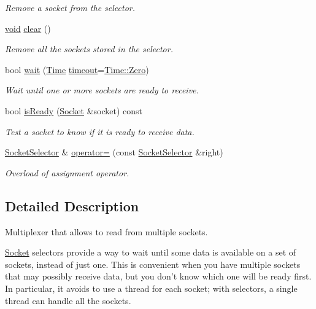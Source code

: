 \begin{DoxyCompactItemize}
\begin{DoxyCompactList}\small\item\em Remove a socket from the selector. \end{DoxyCompactList}\item 
\hyperlink{glutf90_8h_ac778d6f63f1aaf8ebda0ce6ac821b56e}{void} \hyperlink{classsf_1_1_socket_selector_a76e650acb0199d4be91e90a493fbc91a}{clear} ()
\begin{DoxyCompactList}\small\item\em Remove all the sockets stored in the selector. \end{DoxyCompactList}\item 
bool \hyperlink{classsf_1_1_socket_selector_a9cfda5475f17925e65889394d70af702}{wait} (\hyperlink{classsf_1_1_time}{Time} \hyperlink{gl3_8h_ad29bb0d8468b264a4e3d9204366cfaab}{timeout}=\hyperlink{classsf_1_1_time_a8db127b632fa8da21550e7282af11fa0}{Time\-::\-Zero})
\begin{DoxyCompactList}\small\item\em Wait until one or more sockets are ready to receive. \end{DoxyCompactList}\item 
bool \hyperlink{classsf_1_1_socket_selector_a8e67b463db05eadb4d356992c896833c}{is\-Ready} (\hyperlink{classsf_1_1_socket}{Socket} \&socket) const 
\begin{DoxyCompactList}\small\item\em Test a socket to know if it is ready to receive data. \end{DoxyCompactList}\item 
\hyperlink{classsf_1_1_socket_selector}{Socket\-Selector} \& \hyperlink{classsf_1_1_socket_selector_ae6395c7a8d29a9ea14939cc5d1ba3a33}{operator=} (const \hyperlink{classsf_1_1_socket_selector}{Socket\-Selector} \&right)
\begin{DoxyCompactList}\small\item\em Overload of assignment operator. \end{DoxyCompactList}\end{DoxyCompactItemize}


\subsection{Detailed Description}
Multiplexer that allows to read from multiple sockets. 

\hyperlink{classsf_1_1_socket}{Socket} selectors provide a way to wait until some data is available on a set of sockets, instead of just one. This is convenient when you have multiple sockets that may possibly receive data, but you don't know which one will be ready first. In particular, it avoids to use a thread for each socket; with selectors, a single thread can handle all the sockets.

